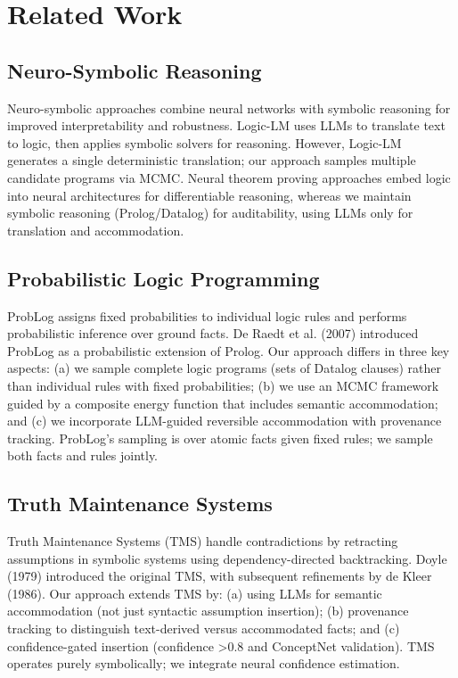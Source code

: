 \documentclass[11pt,letterpaper]{article}
\begin{document}
\section{Related Work}

\subsection{Neuro-Symbolic Reasoning}

Neuro-symbolic approaches combine neural networks with symbolic reasoning for improved interpretability and robustness. Logic-LM \cite{Pan2023} uses LLMs to translate text to logic, then applies symbolic solvers for reasoning. However, Logic-LM generates a single deterministic translation; our approach samples multiple candidate programs via MCMC. Neural theorem proving approaches \cite{Rocktaschel2017} embed logic into neural architectures for differentiable reasoning, whereas we maintain symbolic reasoning (Prolog/Datalog) for auditability, using LLMs only for translation and accommodation.

\subsection{Probabilistic Logic Programming}

ProbLog \cite{DeRaedt2007} assigns fixed probabilities to individual logic rules and performs probabilistic inference over ground facts. De Raedt et al. (2007) introduced ProbLog as a probabilistic extension of Prolog. Our approach differs in three key aspects: (a) we sample complete logic programs (sets of Datalog clauses) rather than individual rules with fixed probabilities; (b) we use an MCMC framework guided by a composite energy function that includes semantic accommodation; and (c) we incorporate LLM-guided reversible accommodation with provenance tracking. ProbLog's sampling is over atomic facts given fixed rules; we sample both facts and rules jointly.

\subsection{Truth Maintenance Systems}

Truth Maintenance Systems (TMS) \cite{Doyle1979} handle contradictions by retracting assumptions in symbolic systems using dependency-directed backtracking. Doyle (1979) introduced the original TMS, with subsequent refinements by de Kleer (1986). Our approach extends TMS by: (a) using LLMs for semantic accommodation (not just syntactic assumption insertion); (b) provenance tracking to distinguish text-derived versus accommodated facts; and (c) confidence-gated insertion (confidence >0.8 and ConceptNet validation). TMS operates purely symbolically; we integrate neural confidence estimation.
\end{document}
